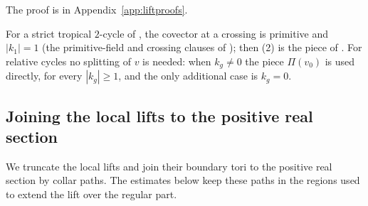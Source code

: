 The proof is in Appendix~\ref{app:liftproofs}.

For a strict tropical $2$-cycle of \cite{CBM}, the covector at a crossing is primitive and $|k_1|=1$
(the primitive-field and crossing clauses of \cite[Def.~7.2]{CBM}); then (2) is the piece of \cite[\S7.7, Step~6]{CBM}. For relative cycles no splitting of $v$ is
needed: when $k_g\ne0$ the piece $\Pi(v_0)$ is used directly, for every $|k_g|\ge1$, and the only additional case is $k_g=0$.

\subsection{Joining the local lifts to the positive real section}\label{ssec:lift-collar}

We truncate the local lifts and join their boundary tori to the positive real section by collar paths.
The estimates below keep these paths in the regions used to extend the lift over the regular part.


